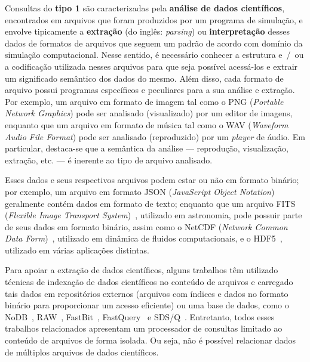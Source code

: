 Consultas do \textbf{tipo 1} são caracterizadas pela \textbf{análise de dados científicos}, encontrados em arquivos que foram produzidos por um programa de simulação, e envolve tipicamente a \textbf{extração} (do inglês: \textit{parsing}) ou \textbf{interpretação} desses dados de formatos de arquivos que seguem um padrão de acordo com domínio da simulação computacional. Nesse sentido, é necessário conhecer a estrutura e~/~ou a codificação utilizada nesses arquivos para que seja possível acessá-los e extrair um significado semântico dos dados do mesmo. Além disso, cada formato de arquivo possui programas específicos e peculiares para a sua análise e extração. Por exemplo, um arquivo em formato de imagem tal como o  PNG (\textit{Portable Network Graphics}) pode ser analisado (visualizado) por um editor de imagens, enquanto que um arquivo em formato de música tal como o  WAV (\textit{Waveform Audio File Format}) pode ser analisado (reproduzido) por um \textit{player} de áudio. Em particular, destaca-se que a semântica da análise --- reprodução, visualização, extração, etc. --- é inerente ao tipo de arquivo analisado.

Esses dados e seus respectivos arquivos podem estar ou não em formato binário; por exemplo, um arquivo em formato  JSON (\textit{JavaScript Object Notation}) geralmente contém dados em formato de texto; enquanto que um arquivo FITS (\textit{Flexible Image Transport System})~\cite{greisen2002representations}, utilizado em astronomia, pode possuir parte de seus dados em formato binário, assim como o NetCDF (\textit{Network Common Data Form})~\cite{rew1990netcdf}, utilizado em dinâmica de fluidos computacionais, e o HDF5~\cite{folk1999hdf5}, utilizado em várias aplicações distintas.

Para apoiar a extração de dados científicos, alguns trabalhos têm utilizado técnicas de indexação de dados científicos no conteúdo de arquivos e carregado tais dados em repositórios externos (arquivos com índices e dados no formato binário para proporcionar um acesso eficiente) ou uma base de dados, como o NoDB~\cite{alagiannis2012nodb}, RAW~\cite{karpathiotakis2014adaptive}, FastBit~\cite{wu2009fastbit}, FastQuery~\cite{chou2011parallel} e SDS/Q~\cite{blanas2014parallel}. Entretanto, todos esses trabalhos relacionados apresentam um processador de consultas limitado ao conteúdo de arquivos de forma isolada. Ou seja, não é possível relacionar dados de múltiplos arquivos de dados científicos.

